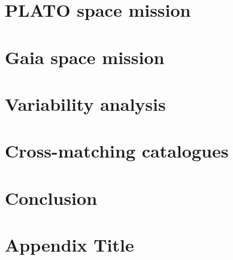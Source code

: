 \documentclass[11pt]{report}
\begin{document}
\chapter{PLATO space mission}


\chapter{Gaia space mission}


\chapter{Variability analysis}


\chapter{Cross-matching catalogues}


\chapter{Conclusion}


\appendix
\chapter{Appendix Title}

\singlespacing
\printbibliography
\end{document}

